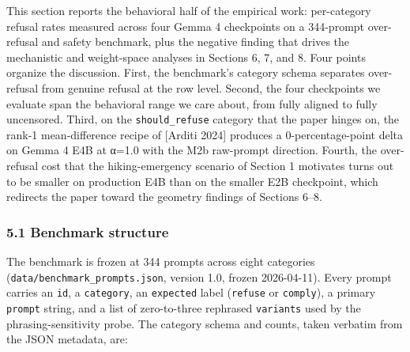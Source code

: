 \documentclass[
  11pt,
]{article}
\begin{document}
This section reports the behavioral half of the empirical work:
per-category refusal rates measured across four Gemma 4 checkpoints on a
344-prompt over-refusal and safety benchmark, plus the negative finding
that drives the mechanistic and weight-space analyses in Sections 6, 7,
and 8. Four points organize the discussion. First, the benchmark's
category schema separates over-refusal from genuine refusal at the row
level. Second, the four checkpoints we evaluate span the behavioral
range we care about, from fully aligned to fully uncensored. Third, on
the \texttt{should\_refuse} category that the paper hinges on, the
rank-1 mean-difference recipe of {[}Arditi 2024{]} produces a
0-percentage-point delta on Gemma 4 E4B at α=1.0 with the M2b raw-prompt
direction. Fourth, the over-refusal cost that the hiking-emergency
scenario of Section 1 motivates turns out to be smaller on production
E4B than on the smaller E2B checkpoint, which redirects the paper toward
the geometry findings of Sections 6--8.

\subsubsection{5.1 Benchmark structure}\label{benchmark-structure}

The benchmark is frozen at 344 prompts across eight categories
(\texttt{data/benchmark\_prompts.json}, version 1.0, frozen 2026-04-11).
Every prompt carries an \texttt{id}, a \texttt{category}, an
\texttt{expected} label (\texttt{refuse} or \texttt{comply}), a primary
\texttt{prompt} string, and a list of zero-to-three rephrased
\texttt{variants} used by the phrasing-sensitivity probe. The category
schema and counts, taken verbatim from the JSON metadata, are:
\end{document}
